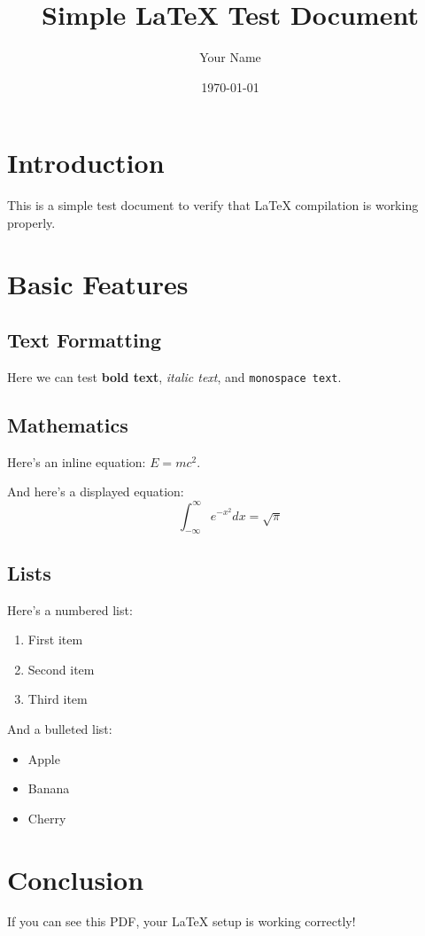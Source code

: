 \documentclass[11pt]{article}
\title{Simple LaTeX Test Document}
\author{Your Name}
\date{\today}
\begin{document}
\maketitle

\section{Introduction}
This is a simple test document to verify that LaTeX compilation is working properly.

\section{Basic Features}

\subsection{Text Formatting}
Here we can test \textbf{bold text}, \textit{italic text}, and \texttt{monospace text}.

\subsection{Mathematics}
Here's an inline equation: $E = mc^2$.

And here's a displayed equation:
\[
\int_{-\infty}^{\infty} e^{-x^2} dx = \sqrt{\pi}
\]

\subsection{Lists}
Here's a numbered list:
\begin{enumerate}
    \item First item
    \item Second item
    \item Third item
\end{enumerate}

And a bulleted list:
\begin{itemize}
    \item Apple
    \item Banana
    \item Cherry
\end{itemize}

\section{Conclusion}
If you can see this PDF, your LaTeX setup is working correctly!
\end{document}
